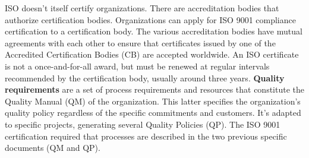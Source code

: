 ISO doesn't itself certify organizations.
There are accreditation bodies that authorize certification bodies.
Organizations can apply for ISO 9001 compliance certification to a certification body.
The various accreditation bodies have mutual agreements with each other to ensure that certificates issued by one of the Accredited Certification Bodies (CB) are accepted worldwide.
An ISO certificate is not a once-and-for-all award, but must be renewed at regular intervals recommended by the certification body, usually around three years.
\textbf{Quality requirements} are a set of process requirements and resources that constitute the Quality Manual (QM) of the organization.
This latter specifies the organization's quality policy regardless of the specific commitments and customers.
It's adapted to specific projects, generating several Quality Policies (QP).
The ISO 9001 certification required that processes are described in the two previous specific documents (QM and QP).
